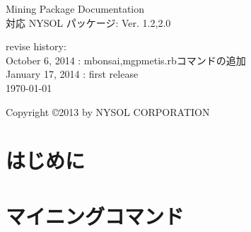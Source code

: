 \documentclass[a4paper]{jsbook}
\begin{document}
\begin{titlepage}
\begin{center}
{\huge Mining Package Documentation}\\
\vspace{10truept}
{\normalsize 対応 NYSOL パッケージ: Ver. 1.2,2.0}\\
\vspace{1cm}

revise history:\\
October 6, 2014 : mbonsai,mgpmetis.rbコマンドの追加\\
January 17, 2014 : first release\\
\vspace{18cm}
{\small \today}

{\small Copyright \copyright 2013 by NYSOL CORPORATION}
\end{center}
\end{titlepage}

\setcounter{tocdepth}{1}
\tableofcontents


\chapter{はじめに}



\chapter{マイニングコマンド}




%


%
%

\end{document}
